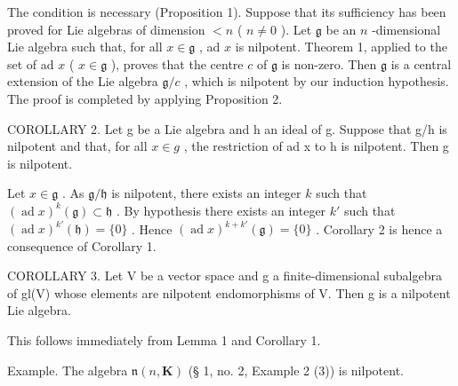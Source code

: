 The condition is necessary (Proposition 1). Suppose that its sufficiency has been proved for Lie algebras of dimension \(< n\) ( \(n \neq 0\) ). Let \(\mathfrak{g}\) be an \(n\) -dimensional Lie algebra such that, for all \(x \in \mathfrak{g}\) , ad \(x\) is nilpotent. Theorem 1, applied to the set of ad \(x\) ( \(x \in \mathfrak{g}\) ), proves that the centre \(c\) of \(\mathfrak{g}\) is non-zero. Then \(\mathfrak{g}\) is a central extension of the Lie algebra \(\mathfrak{g}/c\) , which is nilpotent by our induction hypothesis. The proof is completed by applying Proposition 2.

COROLLARY 2. Let g be a Lie algebra and h an ideal of g. Suppose that g/h is nilpotent and that, for all \(x \in g\) , the restriction of ad x to h is nilpotent. Then g is nilpotent.

Let \(x \in \mathfrak{g}\) . As \(\mathfrak{g} / \mathfrak{h}\) is nilpotent, there exists an integer \(k\) such that \((\operatorname{ad} x)^k(\mathfrak{g}) \subset \mathfrak{h}\) . By hypothesis there exists an integer \(k'\) such that \((\operatorname{ad} x)^{k'}(\mathfrak{h}) = \{0\}\) . Hence \((\operatorname{ad} x)^{k + k'}(\mathfrak{g}) = \{0\}\) . Corollary 2 is hence a consequence of Corollary 1.

COROLLARY 3. Let V be a vector space and g a finite-dimensional subalgebra of gl(V) whose elements are nilpotent endomorphisms of V. Then g is a nilpotent Lie algebra.

This follows immediately from Lemma 1 and Corollary 1.

Example. The algebra \(\mathfrak{n}(n,\mathbf{K})\) (§ 1, no. 2, Example 2 (3)) is nilpotent.

